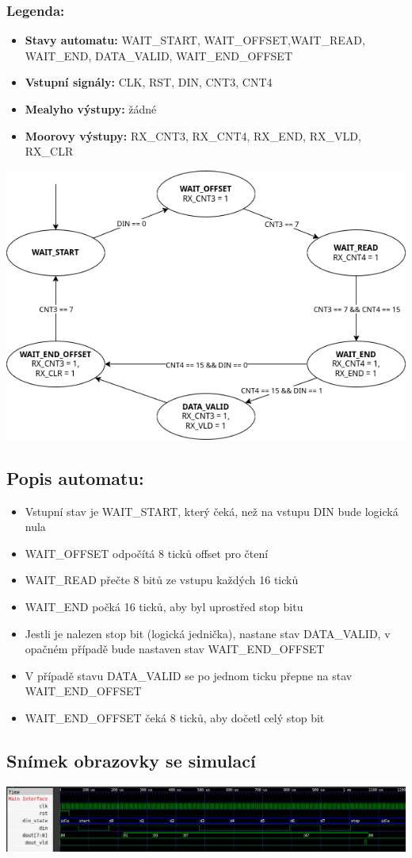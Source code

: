 \documentclass{article}
\begin{document}
	\subsubsection{Legenda:}
	\begin{itemize}
		\item \textbf{Stavy automatu:} WAIT\_START, WAIT\_OFFSET,WAIT\_READ,
				WAIT\_END, DATA\_VALID, WAIT\_END\_OFFSET
		\item \textbf{Vstupní signály:} CLK, RST, DIN, CNT3, CNT4
		\item \textbf{Mealyho výstupy:} žádné
		\item \textbf{Moorovy výstupy:} RX\_CNT3, RX\_CNT4, RX\_END,
				RX\_VLD, RX\_CLR
	\end{itemize}

	\includegraphics[scale=0.69]{./src/automat.png}

	\subsection{Popis automatu:}
	\begin{itemize}
		\item Vstupní stav je WAIT\_START, který čeká, než na vstupu DIN 
				bude logická nula
		\item WAIT\_OFFSET odpočítá 8 ticků offset pro čtení
		\item WAIT\_READ přečte 8 bitů ze vstupu každých 16 ticků
		\item WAIT\_END počká 16 ticků, aby byl uprostřed stop bitu
		\item Jestli je nalezen stop bit (logická jednička), nastane 
				stav DATA\_VALID, v opačném případě bude nastaven stav
				WAIT\_END\_OFFSET
		\item V případě stavu DATA\_VALID se po jednom ticku přepne 
				na stav WAIT\_END\_OFFSET
		\item WAIT\_END\_OFFSET čeká 8 ticků, aby dočetl celý stop bit
	\end{itemize}


	\begin{landscape}
		\section{Snímek obrazovky se simulací}
		\includegraphics[scale=0.5953]{./src/simulation.png}
	\end{landscape}
\end{document}

